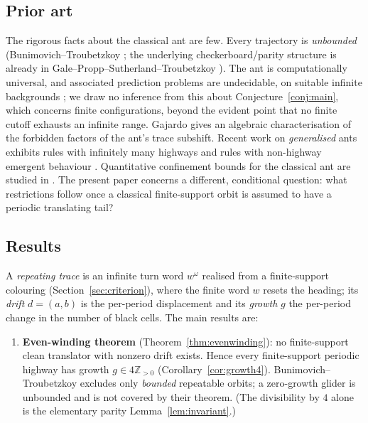 \documentclass[11pt,letterpaper]{article}
\theoremstyle{plain}
\theoremstyle{definition}
\newcommand{\Z}{\mathbb{Z}}
\newcommand{\drift}{d}
\newcommand{\growth}{g}
\begin{document}
\begin{NoHyper}
\subsection{Prior art}
The rigorous facts about the classical ant are few. Every trajectory is
\emph{unbounded} (Bunimovich--Troubetzkoy \cite{BunimovichTroubetzkoy1992}; the
underlying checkerboard/parity structure is already in Gale--Propp--Sutherland--Troubetzkoy
\cite{GaleProppSutnerTroubetzkoy1995}). The ant is computationally universal, and
associated prediction problems are undecidable, on suitable infinite backgrounds
\cite{GajardoMoreiraGoles2002}; we draw no inference from this about
Conjecture~\ref{conj:main}, which concerns finite configurations, beyond the evident
point that no finite cutoff exhausts an infinite range. Gajardo
\cite{Gajardo2003symbolic} gives an algebraic characterisation of the forbidden
factors of the ant's trace subshift. Recent work on \emph{generalised} ants exhibits
rules with infinitely many highways \cite{GajardoLutfallaRao2024} and rules with
non-highway emergent behaviour \cite{Lutfalla2025sideways}. Quantitative confinement
bounds for the classical ant are studied in \cite{Etse2026confined}. The present
paper concerns a different, conditional question: what restrictions follow once a
classical finite-support orbit is assumed to have a periodic translating tail?

\subsection{Results}
A \emph{repeating trace} is an infinite turn word $w^\omega$ realised from a
finite-support colouring (Section~\ref{sec:criterion}), where the finite word $w$
resets the heading; its \emph{drift}
$\drift=(a,b)$ is the per-period displacement and its \emph{growth} $\growth$ the
per-period change in the number of black cells. The main results are:

\begin{enumerate}[leftmargin=2.4em,label=\textbf{(\arabic*)}]
\item \textbf{Even-winding theorem} (Theorem~\ref{thm:evenwinding}): no
finite-support clean translator with nonzero drift exists. Hence every
finite-support periodic highway has growth $\growth\in4\Z_{>0}$
(Corollary~\ref{cor:growth4}). Bunimovich--Troubetzkoy excludes only \emph{bounded}
repeatable orbits; a zero-growth glider is unbounded and is not covered by their
theorem. (The divisibility by $4$ alone is the
elementary parity Lemma~\ref{lem:invariant}.)


\end{enumerate}
\end{NoHyper}
\end{document}

